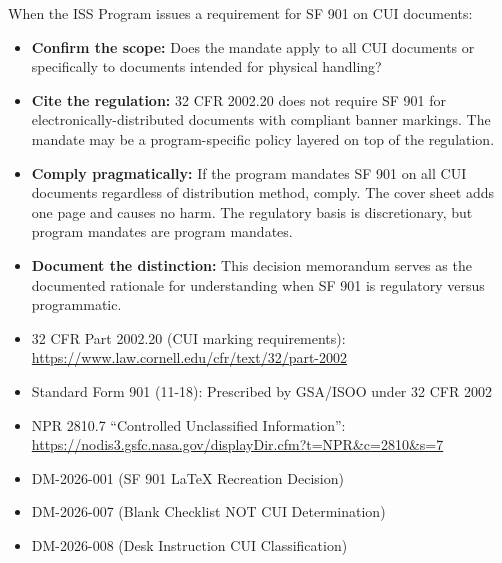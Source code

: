 {\begin{enumerate}

When the ISS Program issues a requirement for SF 901 on CUI documents:

\begin{itemize}
    \item \textbf{Confirm the scope:} Does the mandate apply to all CUI documents or specifically to documents intended for physical handling?
    \item \textbf{Cite the regulation:} 32 CFR 2002.20 does not require SF 901 for electronically-distributed documents with compliant banner markings. The mandate may be a program-specific policy layered on top of the regulation.
    \item \textbf{Comply pragmatically:} If the program mandates SF 901 on all CUI documents regardless of distribution method, comply. The cover sheet adds one page and causes no harm. The regulatory basis is discretionary, but program mandates are program mandates.
    \item \textbf{Document the distinction:} This decision memorandum serves as the documented rationale for understanding when SF 901 is regulatory versus programmatic.
\end{itemize}


\begin{itemize}
    \item 32 CFR Part 2002.20 (CUI marking requirements): \url{https://www.law.cornell.edu/cfr/text/32/part-2002}
    \item Standard Form 901 (11-18): Prescribed by GSA/ISOO under 32 CFR 2002
    \item NPR 2810.7 ``Controlled Unclassified Information'': \url{https://nodis3.gsfc.nasa.gov/displayDir.cfm?t=NPR&c=2810&s=7}
    \item DM-2026-001 (SF 901 LaTeX Recreation Decision)
    \item DM-2026-007 (Blank Checklist NOT CUI Determination)
    \item DM-2026-008 (Desk Instruction CUI Classification)
\end{itemize}

\end{enumerate}
}


